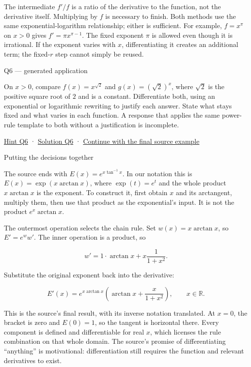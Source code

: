 \documentclass[
  11pt,
]{article}
\providecommand{\gt}{>}
\begin{document}
The intermediate \(f'/f\) is a ratio of the derivative to the function,
not the derivative itself. Multiplying by \(f\) is necessary to finish.
Both methods use the same exponential-logarithm relationship; either is
sufficient. For example, \(f=x^\pi\) on \(x\gt 0\) gives
\(f'=\pi x^{\pi-1}\). The fixed exponent \(\pi\) is allowed even though
it is irrational. If the exponent varies with \(x\), differentiating it
creates an additional term; the fixed-\(r\) step cannot simply be
reused.

Q6 --- generated application

On \(x\gt 0\), compare \(f(x)=x^{\sqrt2}\) and \(g(x)=(\sqrt2)^x\),
where \(\sqrt2\) is the positive square root of \(2\) and is a constant.
Differentiate both, using an exponential or logarithmic rewriting to
justify each answer. State what stays fixed and what varies in each
function. A response that applies the same power-rule template to both
without a justification is incomplete.

\protect\hyperlink{hint-q6}{Hint Q6} ·
\protect\hyperlink{solution-q6}{Solution Q6} ·
\protect\hyperlink{integration}{Continue with the final source example}

Putting the decisions together

The source ends with \(E(x)=e^{x\tan^{-1}x}\). In our notation this is
\(E(x)=\exp(x\arctan x)\), where \(\exp(t)=e^t\) and the whole product
\(x\arctan x\) is the exponent. To construct it, first obtain \(x\) and
its arctangent, multiply them, then use that product as the
exponential's input. It is not the product \(e^x\arctan x\).

The outermost operation selects the chain rule. Set \(w(x)=x\arctan x\),
so \(E'=e^ww'\). The inner operation is a product, so

\[w'=1\cdot\arctan x+x\frac1{1+x^2}.\]

Substitute the original exponent back into the derivative:

\[E'(x)=e^{x\arctan x}
\left(\arctan x+\frac{x}{1+x^2}\right),
\qquad x\in\mathbb R.\]

This is the source's final result, with its inverse notation translated.
At \(x=0\), the bracket is zero and \(E(0)=1\), so the tangent is
horizontal there. Every component is defined and differentiable for real
\(x\), which licenses the rule combination on that whole domain. The
source's promise of differentiating ``anything'' is motivational:
differentiation still requires the function and relevant derivatives to
exist.
\end{document}
